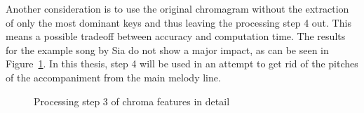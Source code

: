 \begin{figure}[htbp]
	\centering
\end{figure}

\noindent Another consideration is to use the original chromagram without the extraction of only the most dominant keys and thus leaving the processing step 4 out. This means a possible tradeoff between accuracy and computation time. The results for the example song by Sia do not show a major impact, as can be seen in Figure~\ref{fig:nomax}. In this thesis, step 4 will be used in an attempt to get rid of the pitches of the accompaniment from the main melody line.
\begin{figure}[htbp]
	\centering
	\caption{Processing step 3 of chroma features in detail}
	\label{fig:nomax}
\end{figure}


